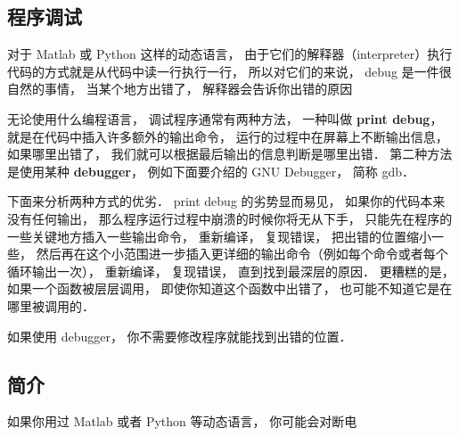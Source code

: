 
\subsection{程序调试}

对于 Matlab 或 Python 这样的动态语言， 由于它们的解释器（interpreter）执行代码的方式就是从代码中读一行执行一行， 所以对它们的来说， debug 是一件很自然的事情， 当某个地方出错了， 解释器会告诉你出错的原因

无论使用什么编程语言， 调试程序通常有两种方法， 一种叫做 \textbf{print debug}， 就是在代码中插入许多额外的输出命令， 运行的过程中在屏幕上不断输出信息， 如果哪里出错了， 我们就可以根据最后输出的信息判断是哪里出错． 第二种方法是使用某种 \textbf{debugger}， 例如下面要介绍的 GNU Debugger， 简称 gdb．

下面来分析两种方式的优劣． print debug 的劣势显而易见， 如果你的代码本来没有任何输出， 那么程序运行过程中崩溃的时候你将无从下手， 只能先在程序的一些关键地方插入一些输出命令， 重新编译， 复现错误， 把出错的位置缩小一些， 然后再在这个小范围进一步插入更详细的输出命令（例如每个命令或者每个循环输出一次）， 重新编译， 复现错误， 直到找到最深层的原因． 更糟糕的是， 如果一个函数被层层调用， 即使你知道这个函数中出错了， 也可能不知道它是在哪里被调用的．

如果使用 debugger， 你不需要修改程序就能找到出错的位置． 

\subsection{简介}
如果你用过 Matlab 或者 Python 等动态语言， 你可能会对断电
